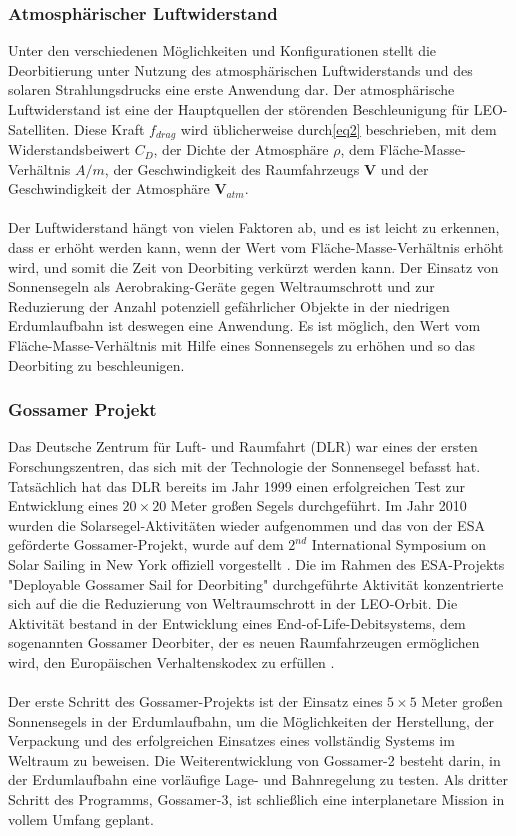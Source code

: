 \documentclass{article}
\begin{document}
\subsubsection{Atmosphärischer Luftwiderstand}
Unter den verschiedenen Möglichkeiten und Konfigurationen stellt die Deorbitierung unter Nutzung des atmosphärischen Luftwiderstands und des solaren Strahlungsdrucks eine erste Anwendung dar. Der atmosphärische Luftwiderstand ist eine der Hauptquellen der störenden Beschleunigung für LEO-Satelliten. Diese Kraft $f_{drag}$ wird üblicherweise durch\autoref{eq2} beschrieben, mit dem Widerstandsbeiwert $C_D$, der Dichte der Atmosphäre $\rho$, dem Fläche-Masse-Verhältnis $A/m$, der Geschwindigkeit des Raumfahrzeugs $\boldsymbol{V}$ und der Geschwindigkeit der Atmosphäre $\boldsymbol{V}_{a t m}$.\\\\
Der Luftwiderstand hängt von vielen Faktoren ab, und es ist leicht zu erkennen, dass er erhöht werden kann, wenn der Wert vom Fläche-Masse-Verhältnis erhöht wird, und somit die Zeit von Deorbiting verkürzt werden kann. Der Einsatz von Sonnensegeln als Aerobraking-Geräte gegen Weltraumschrott und zur Reduzierung der Anzahl potenziell gefährlicher Objekte in der niedrigen Erdumlaufbahn ist deswegen eine Anwendung. Es ist möglich, den Wert vom Fläche-Masse-Verhältnis mit Hilfe eines Sonnensegels zu erhöhen und so das Deorbiting zu beschleunigen.
\subsubsection{Gossamer Projekt}
Das Deutsche Zentrum für Luft- und Raumfahrt (DLR) war eines der ersten Forschungszentren, das sich mit der Technologie der Sonnensegel befasst hat. Tatsächlich hat das DLR bereits im Jahr 1999 einen erfolgreichen Test zur Entwicklung eines $20\times20$ Meter großen Segels durchgeführt. Im Jahr 2010 wurden die Solarsegel-Aktivitäten wieder aufgenommen und das von der ESA geförderte Gossamer-Projekt, wurde auf dem $2^{nd}$ International Symposium on Solar Sailing in New York offiziell vorgestellt \citep{Geppert:2011}. Die im Rahmen des ESA-Projekts "Deployable Gossamer Sail for Deorbiting" durchgeführte Aktivität konzentrierte sich auf die die Reduzierung von Weltraumschrott in der LEO-Orbit. Die Aktivität bestand in der Entwicklung eines End-of-Life-Debitsystems, dem sogenannten Gossamer Deorbiter, der es neuen Raumfahrzeugen ermöglichen wird, den Europäischen Verhaltenskodex zu erfüllen \citep{FERNANDEZ:2014}.\\\\
Der erste Schritt des Gossamer-Projekts ist der Einsatz eines $5\times5$ Meter großen Sonnensegels in der Erdumlaufbahn, um die Möglichkeiten der Herstellung, der Verpackung und des erfolgreichen Einsatzes eines vollständig Systems im Weltraum zu beweisen. Die Weiterentwicklung von Gossamer-2 besteht darin, in der Erdumlaufbahn eine vorläufige Lage- und Bahnregelung zu testen. Als dritter Schritt des Programms, Gossamer-3, ist schließlich eine interplanetare Mission in vollem Umfang geplant.
\end{document}
